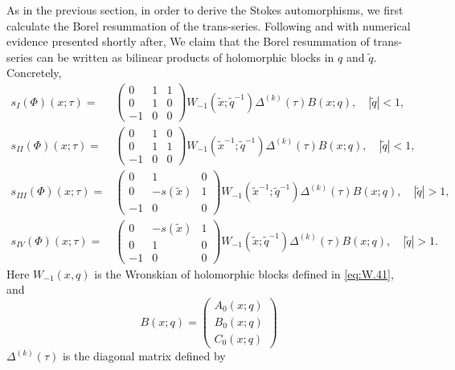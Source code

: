 \documentclass[a4paper,11pt]{article}	%
\def\tq{\tilde{q}}
\def\tx{\tilde{x}}
\begin{document}
As in the previous section, in order to derive the Stokes
automorphisms, we first calculate the Borel resummation of the
trans-series.  Following \cite{Garoufalidis:2020xec} and with
numerical evidence presented shortly after, We claim that the Borel
resummation of trans-series can be written as bilinear products of
holomorphic blocks in $q$ and $\tq$. Concretely,
\begin{subequations}
\begin{align}
  s_{I}(\Phi)(x;\tau) =
  &\begin{pmatrix}
    0&1&1\\
    0&1&0\\
    -1&0&0
  \end{pmatrix}W_{-1}(\tx;\tq^{-1})
       \Delta^{(k)}(\tau) B(x;q), \quad |\tq| <1,
       \label{eq:s1.52}\\
  s_{II}(\Phi)(x;\tau) =
  &\begin{pmatrix}
    0&1&0\\
    0&1&1\\
    -1&0&0
  \end{pmatrix}W_{-1}(\tx^{-1};\tq^{-1})
          \Delta^{(k)}(\tau) B(x;q), \quad |\tq| <1,
          \label{eq:s2.52}\\
  s_{III}(\Phi)(x;\tau) =
  &\begin{pmatrix}
    0&1&0\\
    0&-s(\tx)&1\\
    -1&0&0
  \end{pmatrix} W_{-1}(\tx^{-1};\tq^{-1})
          \Delta^{(k)}(\tau)B(x;q), \quad |\tq| >1,
  \label{eq:s3.52}\\
  s_{IV}(\Phi)(x;\tau) =
  &\begin{pmatrix}
    0&-s(\tx)&1\\
    0&1&0\\
    -1&0&0
  \end{pmatrix} W_{-1}(\tx;\tq^{-1})\Delta^{(k)}(\tau)B(x;q),  \quad |\tq| >1.
                  \label{eq:s4.52}
\end{align}
\end{subequations}
Here $W_{-1}(x,q)$ is the Wronskian of holomorphic blocks defined in
\eqref{eq:W.41}, and
\begin{equation}
  B(x;q) =
  \begin{pmatrix}
    A_0(x;q)\\
    B_0(x;q)\\
    C_0(x;q)
  \end{pmatrix}
\end{equation}
$\Delta^{(k)}(\tau)$ is the diagonal matrix defined by
\end{document}

